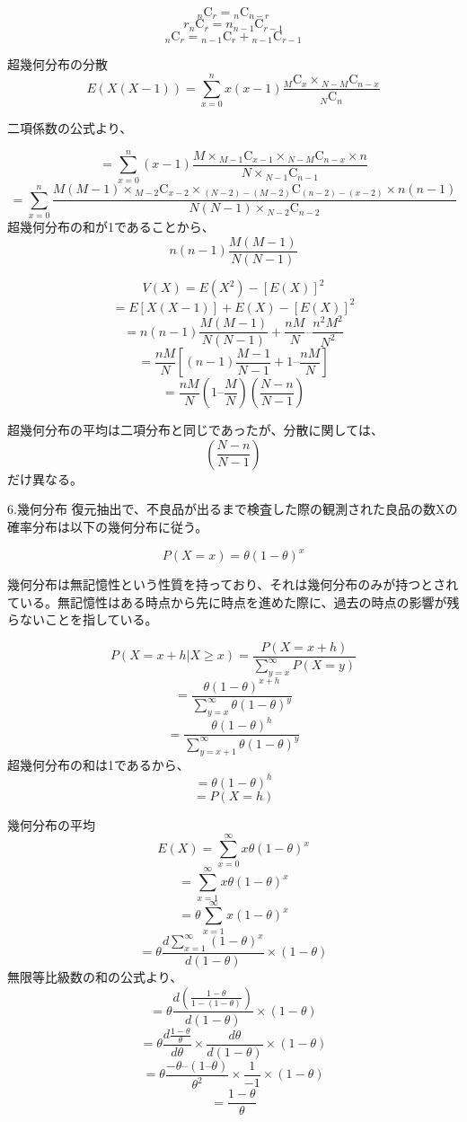 \documentclass[]{article}
\begin{document}
\[ {}_n \mathrm{C} _r = {}_n \mathrm{C} _{n-r} \]
\[r {}_n \mathrm{C} _r = n {}_{n-1} \mathrm{C} _{r-1}\]
\[ {}_n \mathrm{C} _r = {}_{n-1} \mathrm{C} _{r} + {}_{n-1} \mathrm{C} _{r-1}\]

超幾何分布の分散
\[E(X(X-1))= \sum_{x=0}^{n} x(x-1) \frac{ {}_M \mathrm{C} _x \times {}_{N-M} \mathrm{C} _{n-x}}{{}_N \mathrm{C} _n}\]

二項係数の公式より、

\[ = \sum_{x=0}^{n} (x-1) \frac{ M \times {}_{M-1} \mathrm{C} _{x-1} \times {}_{N-M} \mathrm{C} _{n-x} \times n }{ N \times {}_{N-1} \mathrm{C} _{n-1} } \]
\[ = \sum_{x=0}^{n} \frac{ M(M-1) \times {}_{M-2} \mathrm{C} _{x-2} \times {}_{(N-2)-(M-2)} \mathrm{C} _{(n-2)-(x-2)} \times n(n-1) }{ N(N-1) \times {}_{N-2} \mathrm{C} _{n-2}} \]
超幾何分布の和が1であることから、 \[ n(n-1) \frac{M(M-1)}{N(N-1)} \]

\[V(X)=E(X^2)-[ E(X) ]^2\] \[ =E[X(X-1)] + E(X) -[ E(X) ]^2\]
\[ = n(n-1) \frac{M(M-1)}{N(N-1)}+ \frac{nM}{N} – \frac{n^2M^2}{N^2} \]
\[ = \frac{nM}{N} \left[ (n-1) \frac{M-1}{N-1} + 1 – \frac{nM}{N} \right] \]
\[ = \frac{nM}{N} \left( 1 – \frac{M}{N} \right) \left( \frac{N-n}{N-1} \right) \]

超幾何分布の平均は二項分布と同じであったが、分散に関しては、
\[ \left( \frac{N-n}{N-1} \right) \] だけ異なる。

6.幾何分布
復元抽出で、不良品が出るまで検査した際の観測された良品の数Xの確率分布は以下の幾何分布に従う。

\[P(X=x)=\theta ( 1-\theta)^x \]

幾何分布は無記憶性という性質を持っており、それは幾何分布のみが持つとされている。無記憶性はある時点から先に時点を進めた際に、過去の時点の影響が残らないことを指している。

\[P(X=x+h | X \geq x) = \frac{P(X=x+h)}{ \sum_{y=x}^{\infty} P(X=y) }\]
\[ = \frac{ \theta ( 1-\theta)^{x+h} }{ \sum_{y=x}^{\infty} \theta ( 1-\theta)^y } \]
\[ = \frac{ \theta ( 1-\theta)^{h} }{ \sum_{y=x+1}^{\infty} \theta ( 1-\theta)^y } \]
超幾何分布の和は1であるから、 \[ = \theta ( 1-\theta)^h \]
\[ = P(X=h) \]

幾何分布の平均 \[ E(X) = \sum_{x=0}^{\infty} x \theta ( 1-\theta)^x \]
\[ = \sum_{x=1}^{\infty} x \theta ( 1-\theta)^x \]
\[ = \theta \sum_{x=1}^{\infty} x ( 1-\theta)^x \]
\[ = \theta \frac{d \sum_{x=1}^{\infty} (1-\theta)^x}{d(1-\theta)}\times (1-\theta) \]
無限等比級数の和の公式より、
\[ = \theta \frac{d \left( \frac{1-\theta}{1-(1-\theta)} \right) }{d(1-\theta)}\times (1-\theta) \]
\[ = \theta \frac{d \frac{1-\theta}{\theta}}{d \theta} \times \frac{d \theta}{d(1-\theta)}\times (1-\theta)\]
\[ = \theta \frac{-\theta – (1 – \theta)}{\theta^2} \times \frac{1}{-1}\times (1-\theta)\]
\[ = \frac{1-\theta}{\theta}\]
\end{document}
